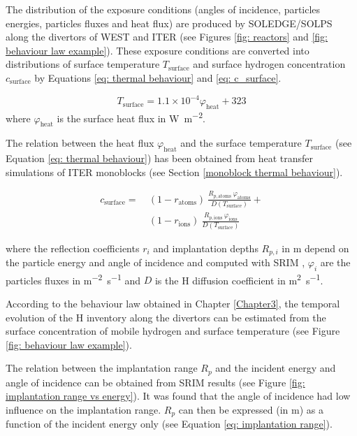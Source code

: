 The distribution of the exposure conditions (angles of incidence, particles energies, particles fluxes and heat flux) are produced by SOLEDGE/SOLPS along the divertors of WEST and ITER (see Figures \ref{fig: reactors} and \ref{fig: behaviour law example}).
These exposure conditions are converted into distributions of surface temperature $T_\mathrm{surface}$ and surface hydrogen concentration $c_\mathrm{surface}$ by Equations \eqref{eq: thermal behaviour} and \eqref{eq: c_surface}.

\begin{equation}
    T_\mathrm{surface} = 1.1\times 10^{-4} \varphi_\mathrm{heat} + 323
    \label{eq: thermal behaviour}
\end{equation}
where $\varphi_\mathrm{heat}$ is the surface heat flux in \si{W.m^{-2}}.

The relation between the heat flux $\varphi_\mathrm{heat}$ and the surface temperature $T_\mathrm{surface}$ (see Equation \eqref{eq: thermal behaviour}) has been obtained from heat transfer simulations of ITER monoblocks (see Section \ref{monoblock thermal behaviour}).

\begin{align}
    \label{eq: c_surface}
    c_\mathrm{surface} = \ &(1 - r_\mathrm{atoms}) \ \frac{R_{p, \mathrm{atoms}} \ \varphi_\mathrm{atoms}}{D(T_\mathrm{surface})} + \\ &(1 - r_\mathrm{ions}) \nonumber \ \frac{R_{p, \mathrm{ions}} \ \varphi_\mathrm{ions}}{D(T_\mathrm{surface})}
\end{align}

where the reflection coefficients $r_i$ and implantation depths $R_{p, i}$ in \si{m} depend on the particle energy and angle of incidence and computed with SRIM , $\varphi_{i}$ are the particles fluxes in \si{m^{-2}.s^{-1}} and $D$ is the H diffusion coefficient in \si{m^{2}.s^{-1}}.


According to the behaviour law obtained in Chapter \ref{Chapter3}, the temporal evolution of the H inventory along the divertors can be estimated from the surface concentration of mobile hydrogen and surface temperature (see Figure \ref{fig: behaviour law example}).



The relation between the implantation range $R_p$ and the incident energy and angle of incidence can be obtained from SRIM  results (see Figure \ref{fig: implantation range vs energy}).
It was found that the angle of incidence had low influence on the implantation range.
$R_p$ can then be expressed (in \si{m}) as a function of the incident energy only (see Equation \eqref{eq: implantation range}).

